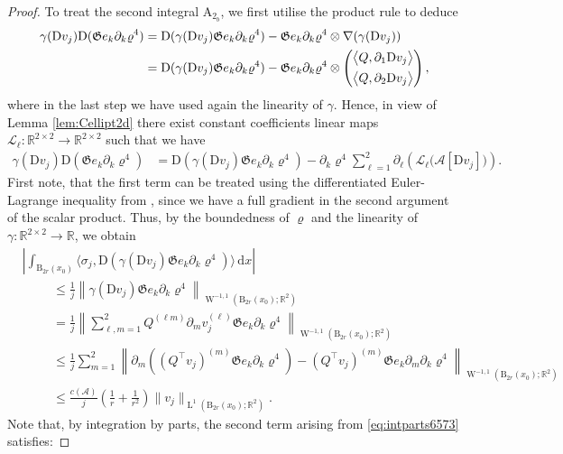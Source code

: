 \documentclass[a4paper,10pt,reqno,oneside]{amsart}
\numberwithin{equation}{section}
\newcommand{\R}{\mathbb R}
\newcommand{\ball}{\mathrm{B}}
\newcommand{\A}{\mathscr{A}}
\newcommand{\lebe}{\operatorname{L}}
\newcommand{\sobo}{\operatorname{W}}
\newcommand{\D}{\mathrm{D}}
\newcommand{\dx}[1]{\,\mathrm{d}#1}
\newcommand{\norm}[1]{\left\lVert#1\right\rVert}
\newcommand{\skalarProd}[2]{\big\langle#1,#2\big\rangle}
\newcommand{\abs}[1]{\left\lvert#1\right\rvert}
\begin{document}
\begin{proof}
\noindent To treat the second integral $\mathrm{A}_{2_{b}}$, we first utilise the product rule to deduce
\begin{align}
 \gamma(\D v_j)\D(\mathfrak{G}e_k \partial_k\varrho^4) &= \D(\gamma(\D v_j)\mathfrak{G}e_k \partial_k\varrho^4) - \mathfrak{G}e_k \partial_k\varrho^4 \otimes \nabla(\gamma(\D v_j))\notag \\
 &= \D(\gamma(\D v_j)\mathfrak{G}e_k \partial_k\varrho^4) - \mathfrak{G}e_k \partial_k\varrho^4 \otimes \begin{pmatrix}\skalarProd{Q}{\partial_1\D v_j}\\[1ex]\skalarProd{Q}{\partial_2\D v_j} \end{pmatrix},
\end{align}
where in the last step we have used again the linearity of  $\gamma$. Hence, in view of Lemma \ref{lem:Cellipt2d} there exist constant coefficients linear maps $\mathcal{L}_\ell:\R^{2\times2}\to\R^{2\times2}$ such that we have
\begin{align}\label{eq:intparts6573}
 \gamma(\D v_j)\D(\mathfrak{G}e_k \partial_k\varrho^4) &= \D(\gamma(\D v_j)\mathfrak{G}e_k \partial_k\varrho^4) -\partial_k\varrho^4\sum_{\ell=1}^2 \partial_\ell\left(\mathcal{L}_{\ell}\big(\A[\D v_j]\big)\right).\end{align}
 First note, that the first term can be treated using the differentiated Euler-Lagrange inequality from , since we have a full gradient in the second argument of the scalar product. Thus, by the boundedness of $\varrho$ and the linearity of $\gamma\colon \R^{2\times2}\to\R$, we obtain 
	\begin{align*}
		&\abs{\int_{\ball_{2r}(x_0)}\skalarProd{\sigma_j}{\D(\gamma(\D v_j)\mathfrak{G}e_k \partial_k\varrho^4)}\dx{x}}\\
		&\hspace{1cm}\le \frac1j\norm{\gamma(\D v_j)\mathfrak{G}e_k \partial_k\varrho^4}_{\sobo^{-1,1}({\ball_{2r}(x_0)};\R^{2})} \\
		&\hspace{1cm} =\frac1j\norm{\sum_{\ell,m=1}^2Q^{(\ell m)}\partial_m v_j^{(\ell)}\mathfrak{G}e_k \partial_k\varrho^4}_{\sobo^{-1,1}({\ball_{2r}(x_0)};\R^{2})}\\
		&\hspace{1cm}\le \frac1j\sum_{m=1}^2\norm{\partial_m\left((Q^\top v_j)^{(m)}\mathfrak{G}e_k \partial_k\varrho^4\right)-(Q^\top v_j)^{(m)}\mathfrak{G}e_k \partial_m\partial_k\varrho^4}_{\sobo^{-1,1}({\ball_{2r}(x_0)};\R^{2})}\\
		&\hspace{1cm}\leq \frac{c(\A)}{j}\left(\frac1r+\frac{1}{r^2}\right)\|v_j\|_{\lebe^1({\ball_{2r}(x_0)};\R^2)}.  
	\end{align*}
Note that, by integration by parts, the second term arising from \eqref{eq:intparts6573} satisfies:


\end{proof}
\end{document}
